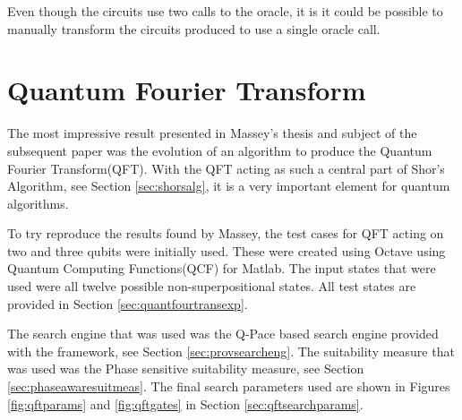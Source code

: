 Even though the circuits use two calls to the oracle, it is it could be possible to manually transform the circuits produced to use a single oracle call.



\section{Quantum Fourier Transform}

The most impressive result presented in Massey's thesis\cite{masseythesis} and subject of the subsequent paper\cite{Massey:2005:EHQ:1068009.1068288} was the evolution of an algorithm to produce the Quantum Fourier Transform(QFT).
With the QFT acting as such a central part of Shor's Algorithm, see Section \ref{sec:shorsalg}, it is a very important element for quantum algorithms.

To try reproduce the results found by Massey, the test cases for QFT acting on two and three qubits were initially used.
These were created using Octave\cite{octweb} using Quantum Computing Functions(QCF) for Matlab\cite{qcfweb}.
The input states that were used were all twelve possible non-superpositional states.
All test states are provided in Section \ref{sec:quantfourtransexp}.


The search engine that was used was the Q-Pace based search engine provided with the framework, see Section \ref{sec:provsearcheng}.
The suitability measure that was used was the Phase sensitive suitability measure, see Section \ref{sec:phaseawaresuitmeas}.
The final search parameters used are shown in Figures \ref{fig:qftparams} and \ref{fig:qftgates} in Section \ref{sec:qftsearchparams}.

